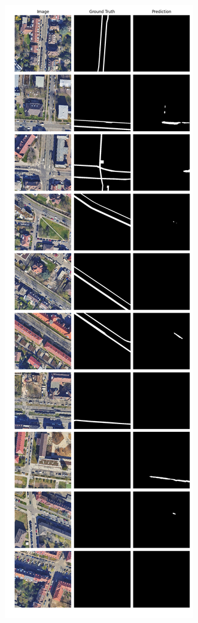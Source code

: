 	\begin{figure}
	\centering
	\begin{subfigure}{.4\textwidth}
		\centering
		\includegraphics[width=1.\textwidth]{Bilder/Samples-KA/bunet2-s.png} 

\end{subfigure}
\end{figure}
